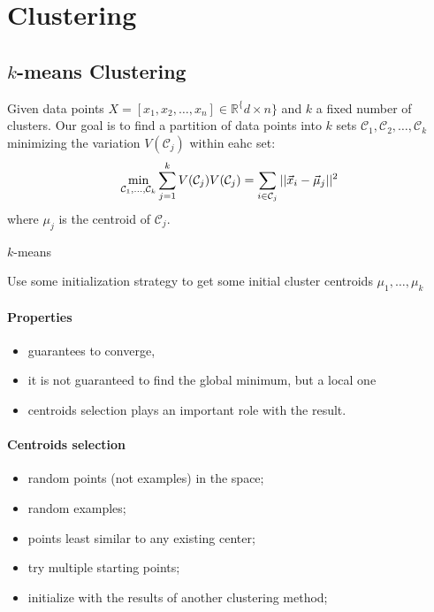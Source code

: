 \documentclass[a4paper,6pt,twocolumn,fleqn]{article}
\begin{document}
\section{Clustering}
\subsection{\(k\)-means Clustering} %
Given data points \(X = [x_1, x_2, \ldots, x_n] \in \mathbb R^\{d \times n\}\) and \(k\) a fixed number of clusters. Our goal is to find a partition of data points into \(k\) sets \(\mathcal C_1, \mathcal C_2, \ldots, \mathcal C_k\) minimizing the variation \(V(\mathcal C_j)\) within eahc set:
\begin{equation}
    \min_{\mathcal C_1,\ldots,\mathcal C_k} \sum_{j=1}^k V(\mathcal C_j)\\
    V(\mathcal C_j) = \sum_{i \in \mathcal C_j} || \vec x_i - \vec \mu_j||^2
\end{equation}
where \(\mu_j\) is the centroid of \(\mathcal C_j\).

\begin{algorithm}
    \caption{$k$-means}
    Use some initialization strategy to get some initial cluster centroids $\mu_1,\ldots,\mu_k$\;
\end{algorithm}
\paragraph{Properties}
\begin{itemize}
    \item guarantees to converge,
    \item it is not guaranteed to find the global minimum, but a local one
    \item centroids selection plays an important role with the result.
\end{itemize}
\paragraph{Centroids selection}
\begin{itemize}
    \item random points (not examples) in the space;
    \item random examples;
    \item points least similar to any existing center;
    \item try multiple starting points;
    \item initialize with the results of another clustering method;
\end{itemize}
\end{document}
